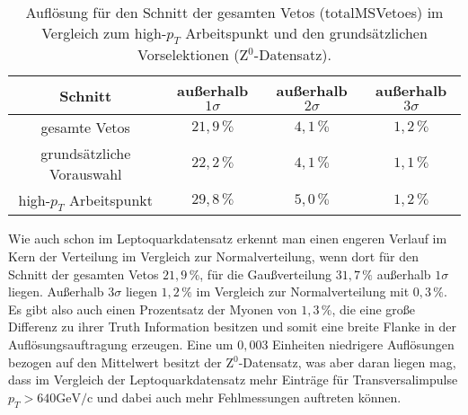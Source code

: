 \begin{table}[htbp]
		\centering
		\begin{tabular*}{\linewidth}{@{\extracolsep{\fill}}cccc}
		\hline
		\hline
		\rule[-7pt]{0pt}{23pt} Schnitt & außerhalb $1\sigma$ & außerhalb $2\sigma$ & außerhalb $3\sigma$
		\\
		\hline
		\rule[-6pt]{0pt}{21pt} gesamte Vetos               & \(21,9\,\%\) & $4,1\,\%$ & $1,2\,\%$
		\\
		\rule[-6pt]{0pt}{21pt} grundsätzliche Vorauswahl   &  \(22,2\,\%\)	& $4,1\,\%$ & $1,1\,\%$
		\\
		\rule[-6pt]{0pt}{21pt} high-$p_T$ Arbeitspunkt     &  \(29,8\,\%\)	& $5,0\,\%$ & $1,2\,\%$
		\\
		\hline
		\hline
		\end{tabular*}
		\caption[Auflösung für den Schnitt der gesamten Vetos für den Z$^0$-Datensatz]{Auflösung für den Schnitt der gesamten Vetos (totalMSVetoes) im Vergleich zum high-$p_T$ Arbeitspunkt und den grundsätzlichen Vorselektionen (Z$^0$-Datensatz).}
		\label{123sigmaIndiv5Z}
	\end{table}
Wie auch schon im Leptoquarkdatensatz erkennt man einen engeren Verlauf im Kern der Verteilung im Vergleich zur Normalverteilung, wenn dort für den Schnitt der gesamten Vetos $21,9\,\%$, für die Gaußverteilung $31,7\,\%$ außerhalb $1\sigma$ liegen. Außerhalb $3\sigma$ liegen $1,2\,\%$ im Vergleich zur Normalverteilung mit $0,3\,\%$. Es gibt also auch einen Prozentsatz der Myonen von $1,3\,\%$, die eine große Differenz zu ihrer Truth Information besitzen und somit eine breite Flanke in der Auflösungsauftragung erzeugen.
Eine um $0,003$ Einheiten niedrigere Auflösungen bezogen auf den Mittelwert besitzt der Z$^0$-Datensatz, was aber daran liegen mag, dass im Vergleich der Leptoquarkdatensatz mehr Einträge für Transversalimpulse $p_T>640\text{GeV}/\text{c}$ und dabei auch mehr Fehlmessungen auftreten können. 
	
